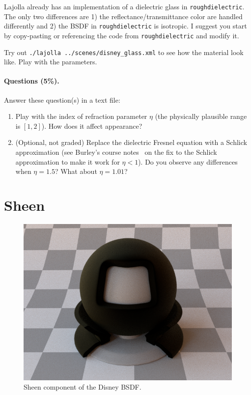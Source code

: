 Lajolla already has an implementation of a dielectric glass in \lstinline{roughdielectric}. The only two differences are 1) the reflectance/transmittance color are handled differently and 2) the BSDF in \lstinline{roughdielectric} is isotropic. I suggest you start by copy-pasting or referencing the code from \lstinline{roughdielectric} and modify it.

Try out \lstinline{./lajolla ../scenes/disney_glass.xml} to see how the material look like. Play with the parameters.

\paragraph{Questions (5\%).} Answer these question(s) in a text file:
\begin{enumerate}
	\item Play with the index of refraction parameter $\eta$ (the physically plausible range is $[1, 2]$). How does it affect appearance?
	\item (Optional, not graded) Replace the dielectric Fresnel equation with a Schlick approximation (see Burley's course notes~\cite{Burley:2015:EDB} on the fix to the Schlick approximation to make it work for $\eta < 1$). Do you observe any differences when $\eta=1.5$? What about $\eta=1.01$?
\end{enumerate}

\section{Sheen}
\begin{figure}
	\centering
	\includegraphics[width=0.5\linewidth]{imgs/disney_sheen.png}
	\caption{Sheen component of the Disney BSDF.}
\end{figure}

